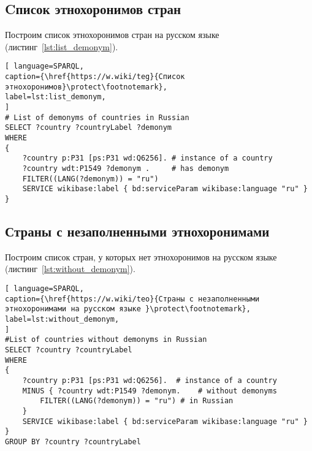 

\subsection{Cписок этнохоронимов стран}


Построим список этнохоронимов стран на русском языке (листинг~\ref{lst:list_demonym}).

\begin{lstlisting}[ language=SPARQL, 
caption={\href{https://w.wiki/teg}{Cписок этнохоронимов}\protect\footnotemark},
label=lst:list_demonym, 
]
# List of demonyms of countries in Russian
SELECT ?country ?countryLabel ?demonym
WHERE
{
	?country p:P31 [ps:P31 wd:Q6256]. # instance of a country
	?country wdt:P1549 ?demonym .     # has demonym
	FILTER((LANG(?demonym)) = "ru")
	SERVICE wikibase:label { bd:serviceParam wikibase:language "ru" }
}
\end{lstlisting}


\subsection{Страны с незаполненными этнохоронимами}

Построим список стран, у которых нет этнохоронимов на русском языке (листинг~\ref{lst:without_demonym}).
\begin{lstlisting}[ language=SPARQL, 
caption={\href{https://w.wiki/teo}{Страны с незаполненными этнохоронимами на русском языке }\protect\footnotemark},
label=lst:without_demonym, 
]
#List of countries without demonyms in Russian
SELECT ?country ?countryLabel 
WHERE
{
	?country p:P31 [ps:P31 wd:Q6256].  # instance of a country
	MINUS { ?country wdt:P1549 ?demonym.    # without demonyms
		FILTER((LANG(?demonym)) = "ru") # in Russian
	}
	SERVICE wikibase:label { bd:serviceParam wikibase:language "ru" }
}
GROUP BY ?country ?countryLabel
\end{lstlisting}

